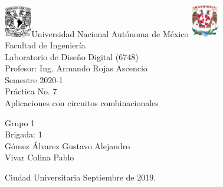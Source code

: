 

\begin{titlepage}
     \begin{center}
	\includegraphics[width=0.09\textwidth]{UNAM}\Large Universidad Nacional Autónoma de México
        	\includegraphics[width=0.09\textwidth]{FI}\\[2cm]
        \Large Facultad de Ingeniería\\[2cm]
         \Large Laboratorio de Diseño Digital (6748)\\[2cm]
         \footnotesize Profesor: Ing. Armando Rojas Ascencio\\[2cm]
        \footnotesize Semestre 2020-1\\[2cm]
        
       

        \Large Práctica No. 7\\[2cm]
        
           

\Large Aplicaciones con circuitos combinacionales
        
          \begin{flushright}
\footnotesize  Grupo 1\\[0.5cm]
\footnotesize Brigada: 1\\[0.5cm]
\footnotesize Gómez Álvarez Gustavo Alejandro\\[0.5cm]
\footnotesize Vivar Colina Pablo\\[0.5cm]
 \end{flushright}
          \begin{flushleft}
        \footnotesize Ciudad Universitaria Septiembre de 2019.\\
          \end{flushleft}
         
          
   \end{center}
\end{titlepage}
